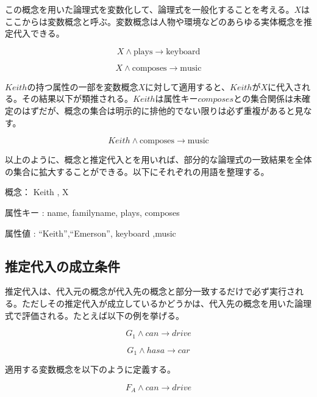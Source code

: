 \documentclass[12pt]{article}
\begin{document}
この概念を用いた論理式を変数化して、論理式を一般化することを考える。\(X\)はここからは変数概念と呼ぶ。変数概念は人物や環境などのあらゆる実体概念を推定代入できる。

\begin{equation} X \wedge \text{plays} \rightarrow \text{keyboard}\end{equation}

\begin{equation} X \wedge \text{composes} \rightarrow \text{music}\end{equation}

\(Keith\)の持つ属性の一部を変数概念\(X\)に対して適用すると、\(Keith\)が\(X\)に代入される。その結果以下が類推される。\(Keith\)は属性キー\(composes\)との集合関係は未確定のはずだが、概念の集合は明示的に排他的でない限りは必ず重複があると見なす。

\begin{equation} Keith \wedge \text{composes} \rightarrow \text{music}\end{equation}

以上のように、概念と推定代入とを用いれば、部分的な論理式の一致結果を全体の集合に拡大することができる。以下にそれぞれの用語を整理する。

概念： Keith , X

属性キー : name, familyname, plays, composes

属性値 : ``Keith'',``Emerson'', keyboard ,music

\subsection{推定代入の成立条件}\label{ux63a8ux5b9aux4ee3ux5165ux306eux6210ux7acbux6761ux4ef6}

推定代入は、代入元の概念が代入先の概念と部分一致するだけで必ず実行される。ただしその推定代入が成立しているかどうかは、代入先の概念を用いた論理式で評価される。たとえば以下の例を挙げる。

\begin{equation} G_1 \wedge can \rightarrow drive \end{equation}

\begin{equation} G_1 \wedge hasa \rightarrow car \end{equation}

適用する変数概念を以下のように定義する。

\begin{equation} F_A \wedge can \rightarrow drive \end{equation}
\end{document}
